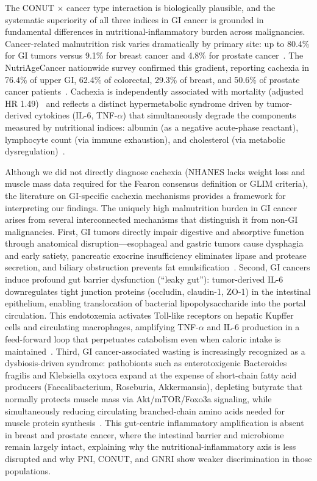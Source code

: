 \documentclass[review]{elsarticle}
\begin{document}
The CONUT $\times$ cancer type interaction is biologically plausible, and the systematic superiority of all three indices in GI cancer is grounded in fundamental differences in nutritional-inflammatory burden across malignancies. Cancer-related malnutrition risk varies dramatically by primary site: up to 80.4\% for GI tumors versus 9.1\% for breast cancer and 4.8\% for prostate cancer~\cite{kapala2025}. The NutriAgeCancer nationwide survey confirmed this gradient, reporting cachexia in 76.4\% of upper GI, 62.4\% of colorectal, 29.3\% of breast, and 50.6\% of prostate cancer patients~\cite{poisson2021}. Cachexia is independently associated with mortality (adjusted HR 1.49)~\cite{poisson2021} and reflects a distinct hypermetabolic syndrome driven by tumor-derived cytokines (IL-6, TNF-$\alpha$) that simultaneously degrade the components measured by nutritional indices: albumin (as a negative acute-phase reactant), lymphocyte count (via immune exhaustion), and cholesterol (via metabolic dysregulation)~\cite{fearon2011}.

Although we did not directly diagnose cachexia (NHANES lacks weight loss and muscle mass data required for the Fearon consensus definition or GLIM criteria), the literature on GI-specific cachexia mechanisms provides a framework for interpreting our findings. The uniquely high malnutrition burden in GI cancer arises from several interconnected mechanisms that distinguish it from non-GI malignancies. First, GI tumors directly impair digestive and absorptive function through anatomical disruption---esophageal and gastric tumors cause dysphagia and early satiety, pancreatic exocrine insufficiency eliminates lipase and protease secretion, and biliary obstruction prevents fat emulsification~\cite{fearon2011}. Second, GI cancers induce profound gut barrier dysfunction (``leaky gut''): tumor-derived IL-6 downregulates tight junction proteins (occludin, claudin-1, ZO-1) in the intestinal epithelium, enabling translocation of bacterial lipopolysaccharide into the portal circulation. This endotoxemia activates Toll-like receptors on hepatic Kupffer cells and circulating macrophages, amplifying TNF-$\alpha$ and IL-6 production in a feed-forward loop that perpetuates catabolism even when caloric intake is maintained~\cite{poisson2021}. Third, GI cancer-associated wasting is increasingly recognized as a dysbiosis-driven syndrome: pathobionts such as enterotoxigenic Bacteroides fragilis and Klebsiella oxytoca expand at the expense of short-chain fatty acid producers (Faecalibacterium, Roseburia, Akkermansia), depleting butyrate that normally protects muscle mass via Akt/mTOR/Foxo3a signaling, while simultaneously reducing circulating branched-chain amino acids needed for muscle protein synthesis~\cite{bindels2016}. This gut-centric inflammatory amplification is absent in breast and prostate cancer, where the intestinal barrier and microbiome remain largely intact, explaining why the nutritional-inflammatory axis is less disrupted and why PNI, CONUT, and GNRI show weaker discrimination in those populations.
\end{document}
